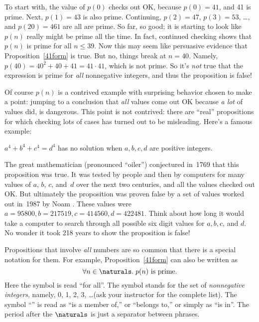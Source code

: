 \begin{editingnoes}
To start with, the value of $p(0)$ checks out OK, because $p(0) = 41$,
and 41 is prime.  Next, $p(1) = 43$ is also prime.  Continuing, $p(2)
= 47$, $p(3)=53$, \dots, and $p(20) = 461$ are all are prime.  So far,
so good; it is starting to look like $p(n)$ really might be prime all
the time.  In fact, continued checking shows that $p(n)$ is prime for
all $n \le 39$.  Now this may seem like persuasive evidence that
Proposition~\ref{41form} is true.  But no, things break at $n=40$.
Namely, $p(40) = 40^2 + 40 + 41 = 41 \cdot 41$, which is not prime.
So it's \emph{not} true that the expression is prime for \emph{all}
nonnegative integers, and thus the proposition is false!

Of course $p(n)$ is a contrived example with surprising behavior
chosen to make a point: jumping to a conclusion that \emph{all} values
come out OK because \emph{a lot} of values did, is dangerous.  This
point is not contrived: there are ``real'' propositions for which
checking lots of cases has turned out to be misleading.  Here's a
famous example:
\begin{proposition}\label{a4}
$a^4 + b^4 + c^4 = d^4$ has no solution when $a, b, c, d$ are positive
integers.
\end{proposition}
The great mathematician  (pronounced ``oiler'') conjectured
in~1769 that this proposition was true.  It was tested by people and
then by computers for many values of $a$, $b$, $c$, and~$d$ over the
next two centuries, and all the values checked out OK.  But ultimately
the proposition was proven false by a set of values worked out in~1987
by Noam .  These values were $a = 95800, b = 217519, c =
414560, d = 422481$.  Think about how long it would take a computer to
search through all possible six digit values for $a,b,c$, and $d$.
No wonder it took 218 years to show the proposition is false!

Propositions that involve \emph{all} numbers are so common that there
is a special notation for them.  For example, Proposition~\ref{41form}
can also be written as
\begin{equation}\label{pn}
\forall n \in \naturals.\; p(n) \text{ is prime}.
\end{equation}
Here the symbol \term{$\forall$} is read ``for all''.  The symbol
\term{$\naturals$} stands for the set of \emph{nonnegative integers},
namely, 0, 1, 2, 3, \dots (ask your instructor for the complete list).
The symbol ``\term{$\in$}'' is read as ``is a member of,'' or
``belongs to,'' or simply as ``is in''.  The period after the
$\naturals$ is just a separator between phrases.


\end{editingnoes}
